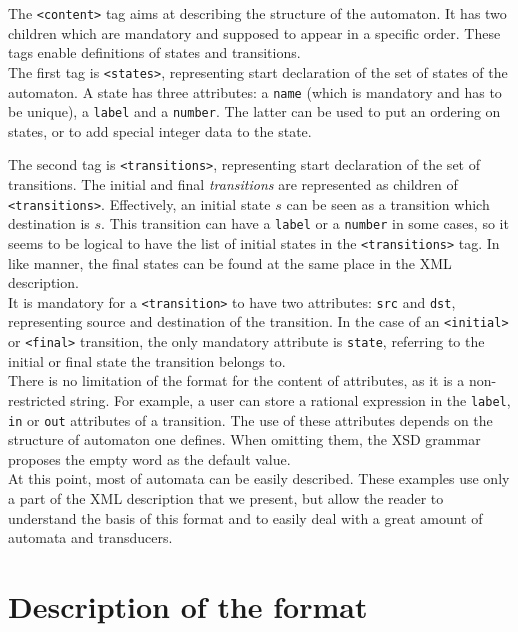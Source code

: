 \documentclass[a4paper]{article}
\def\contenttag{\texttt{<content>}}
\def\statestag{\texttt{<states>}}
\def\dstname{\texttt{dst}}
\def\srcname{\texttt{src}}
\def\transitionstag{\texttt{<transitions>}}
\def\transitiontag{\texttt{<transition>}}
\def\finaltag{\texttt{<final>}}
\def\initialtag{\texttt{<initial>}}
\def\nameattr{\texttt{name}}
\def\labelattr{\texttt{label}}
\def\inattr{\texttt{in}}
\def\outattr{\texttt{out}}
\def\numberattr{\texttt{number}}
\def\stateattr{\texttt{state}}
\begin{document}
The \contenttag{} tag aims at describing the structure of the
automaton. It has two children which are mandatory and supposed to appear in a
specific order. These tags enable definitions of states and
transitions. \\

The first tag is \statestag{}, representing start declaration of
the set of states of the automaton. A state has three attributes: a
\nameattr{} (which is mandatory and has to be unique), a \labelattr{}
and a \numberattr{}. The latter can be used to put an ordering on states,
or to add special integer data to the state.

The second tag is \transitionstag{}, representing start declaration
of the set of transitions. The initial and final
\textit{transitions} are represented as children of
\transitionstag{}. Effectively, an initial state $s$ can be seen as a transition
which destination is $s$. This transition can have a \labelattr{} or a
\numberattr{} in some cases, so it seems to be logical to have the list of
initial states in the \transitionstag{} tag. In like manner, the final
states can be found at the same place in the XML description.\\
It is mandatory for a \transitiontag{} to
have two attributes: \srcname{} and \dstname{}, representing source
and destination of the transition. In the case of an \initialtag{}
or \finaltag{} transition, the only mandatory attribute is
\stateattr{}, referring to the initial or final state the transition belongs to.\\

There is no limitation of the format for the content
of attributes, as it is a non-restricted string. For example, a user
can store a rational expression in the \labelattr{}, \inattr{} or \outattr{}
 attributes of a transition. The use of these attributes depends on the
structure of automaton one defines. When omitting them, the XSD grammar
proposes the empty word as the default value.\\

At this point, most of automata can be easily described. These examples use
only a part of the XML description that we present, but allow the reader to
understand the basis of this format and to easily deal with a great amount of
automata and transducers.

\section{Description of the format}
\end{document}
